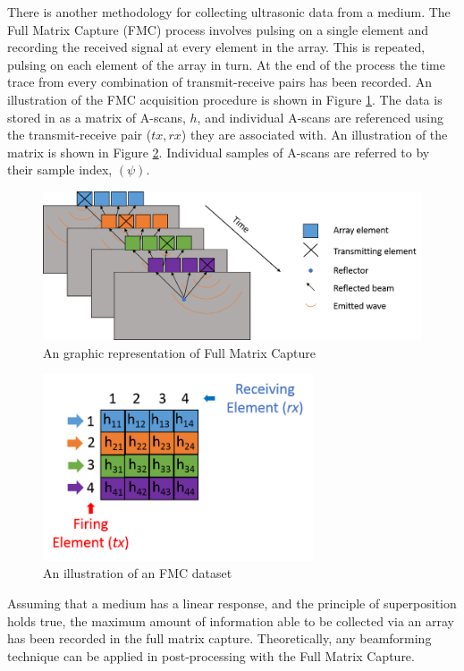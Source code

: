There is another methodology for collecting ultrasonic data from a medium. The Full Matrix Capture (FMC) process involves pulsing on a single element and recording the received signal at every element in the array. This is repeated, pulsing on each element of the array in turn. At the end of the process the time trace from every combination of transmit-receive pairs has been recorded\cite{holmes_post-processing_2005}. An illustration of the FMC acquisition procedure is shown in Figure \ref{fig:FMC1}. The data is stored in as a matrix of A-scans, $h$, and individual A-scans are referenced using the transmit-receive pair ($tx,rx$) they are associated with. An illustration of the matrix is shown in Figure \ref{fig:FMC2}. Individual samples of A-scans are referred to by their sample index, $(\psi)$.

\begin{figure}[htbp]
\centering
		\includegraphics[width=\textwidth]{FMC.png}
		\caption{An graphic representation of Full Matrix Capture}
		\label{fig:FMC1}
\end{figure}

\begin{figure}[htbp]
\centering
		\includegraphics[width=80mm]{FMC_elements.png}
		\caption{An illustration of an FMC dataset}
		\label{fig:FMC2}
\end{figure}


Assuming that a medium has a linear response, and the principle of superposition holds true, the maximum amount of information able to be collected via an array has been recorded in the full matrix capture. Theoretically, any beamforming technique can be applied in post-processing with the Full Matrix Capture.

